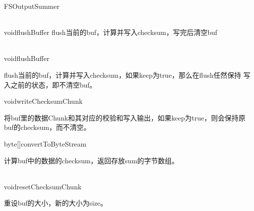 \begin{XeClass}{FSOutputSummer}
\begin{XeMethod}{\XeProtected \\ \XeSync}{void}{flushBuffer}
 flush当前的buf，计算并写入checksum，写完后清空buf

    \end{XeMethod}

    \begin{XeMethod}{\XeProtected \\ \XeSync}{void}{flushBuffer}
         
 flush当前的buf，计算并写入checksum，如果keep为true，那么在flush任然保持
 写入之前的状态，即不清空buf。

    \end{XeMethod}

    \begin{XeMethod}{\XePrivate}{void}{writeChecksumChunk}
         
 将buf里的数据Chunk和其对应的校验和写入输出，如果keep为true，则会保持原
 buf的checksum，而不清空。

    \end{XeMethod}

    \begin{XeMethod}{\XePublic}{byte[]}{convertToByteStream}
         
 计算buf中的数据的checksum，返回存放sum的字节数组。

    \end{XeMethod}

    \begin{XeMethod}{\XeProtected \\ \XeSync}{void}{resetChecksumChunk}
         
 重设buf的大小，新的大小为size。

    \end{XeMethod}

\end{XeClass}
